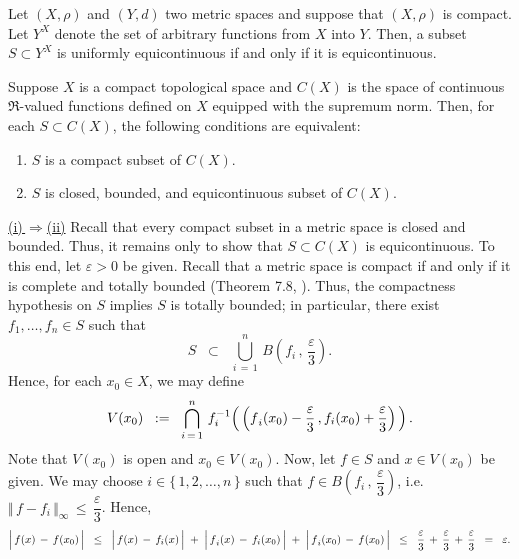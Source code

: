\begin{proposition}
\mbox{}\vskip 0.1cm
\noindent
Let $(X,\rho)$ and $(Y,d)$ two metric spaces and suppose that $(X,\rho)$ is compact.
Let $Y^{X}$ denote the set of arbitrary functions from $X$ into $Y$.
Then, a subset $S \subset Y^{X}$ is uniformly equicontinuous if and only if it is equicontinuous.
\end{proposition}

\begin{theorem}
\label{ArzelaAscoliTheorem}
\mbox{}\vskip 0.1cm
\noindent
Suppose $X$ is a compact topological space and
$C(X)$ is the space of continuous $\Re$-valued functions defined on $X$ equipped with the supremum norm.
Then, for each $S \subset C(X)$, the following conditions are equivalent:
\begin{enumerate}
\item	$S$ is a compact subset of $C(X)$.
\item	$S$ is closed, bounded, and equicontinuous subset of $C(X)$.
\end{enumerate}
\end{theorem}
\proof
\vskip 0.1cm
\noindent
\underline{(i)\,\;$\Longrightarrow$\;(ii)}
\vskip 0.1cm
\noindent
Recall that every compact subset in a metric space is closed and bounded.
Thus, it remains only to show that $S \subset C(X)$ is equicontinuous.
To this end, let $\varepsilon > 0$ be given.
Recall that a metric space is compact if and only if it is complete and totally bounded (Theorem 7.8, \cite{Aliprantis1998}).
Thus, the compactness hypothesis on $S$ implies $S$ is totally bounded;
in particular, there exist $f_{1}, \ldots, f_{n} \in S$ such that
\begin{equation*}
S \;\; \subset \;\; \bigcup_{i\,=\,1}^{n}\,B\!\left(f_{i}\,,\,\dfrac{\varepsilon}{3}\right).
\end{equation*}
Hence, for each $x_{0} \in X$, we may define
\begin{equation*}
V(x_{0}) \;\; := \;\;
\bigcap_{i\,=\,1}^{n}\,
f_{i}^{-1}\!\left(\,
	\left(\overset{{\color{white}.}}{f}_{i}(x_{0})-\dfrac{\varepsilon}{3}\,,f_{i}(x_{0})+\dfrac{\varepsilon}{3}\right)
\,\right).
\end{equation*}
Note that $V(x_{0})$ is open and $x_{0} \in V(x_{0})$.
Now, let $f \in S$ and $x \in V(x_{0})$ be given.
We may choose $i \in \{\,1,2,\ldots,n\,\}$ such that $f \in B\!\left(f_{i}\,,\,\dfrac{\varepsilon}{3}\right)$,
i.e. $\Vert\,f-f_{i}\,\Vert_{\infty}\,\leq\,\dfrac{\varepsilon}{3}$.
Hence,
\begin{equation*}
\left\vert\,\overset{{\color{white}.}}{f}(x) \,-\, f(x_{0})\,\right\vert
\;\;\leq\;\; \left\vert\,\overset{{\color{white}.}}{f}(x) \,-\, f_{i}(x)\,\right\vert
		\;+\;\left\vert\,\overset{{\color{white}.}}{f}_{i}(x) \,-\, f_{i}(x_{0})\,\right\vert
		\;+\;\left\vert\,\overset{{\color{white}.}}{f}_{i}(x_{0}) \,-\, f(x_{0})\,\right\vert
\;\;\leq\;\; \dfrac{\varepsilon}{3} \,+\, \dfrac{\varepsilon}{3} \,+\, \dfrac{\varepsilon}{3}
\;\; = \;\; \varepsilon.
\end{equation*}
